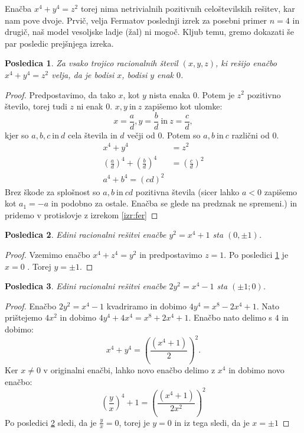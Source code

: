 \documentclass[a4paper, 10pt]{article}
\newtheorem{posl}{Posledica}[izr]
\begin{document}
Enačba $x^4 + y^4 = z^2$ torej nima netrivialnih pozitivnih celoštevilskih rešitev, kar nam pove dvoje. Prvič, velja Fermatov poslednji izrek za posebni primer $n = 4$ in drugič, naš model vesoljske ladje (žal) ni mogoč. Kljub temu, gremo dokazati še par posledic prejšnjega izreka.

\begin{posl}
\label{pos:ena}
Za vsako trojico racionalnih števil $(x, y, z)$, ki rešijo enačbo $x^4 + y^4 = z^2$ velja, da je bodisi $x$, bodisi $y$ enak $0$.
\end{posl}

\begin{proof}
Predpostavimo, da tako $x$, kot $y$ nista enaka $0$. Potem je $z^2$ pozitivno število, torej tudi $z$ ni enak $0$. $x, y~\text{in}~z$ zapišemo kot ulomke:
\[
x = \frac{a}{d}, y = \frac{b}{d}~\text{in}~z=\frac{c}{d},
\]
kjer so $a, b, c~\text{in}~d$ cela števila in $d$ večji od $0$. Potem so $a, b~\text{in}~c$ različni od $0$.
\begin{align*}
x^4 + y^4 &= z^2 \\
(\frac{a}{d})^4 + (\frac{b}{d})^4 &= (\frac{c}{d})^2 \\
a^4 + b^4 = (cd)^2
\end{align*}
Brez škode za splošnost so $a, b~\text{in}~cd$ pozitivna števila (sicer lahko $a<0$ zapišemo kot $a_1 = -a$ in podobno za ostale. Enačba se glede na predznak ne spremeni.) in pridemo v protislovje z izrekom \ref{izr:fer}
\end{proof}

\begin{posl}
\label{pos:dva}
Edini racionalni rešitvi enačbe $y^2 = x^4 + 1$ sta $(0, \pm1)$.
\end{posl}

\begin{proof}
Vzemimo enačbo $x^4 + z^4 = y^2$ in predpostavimo $z = 1$. Po posledici \ref{pos:ena} je $x = 0$ . Torej $y = \pm 1$.
\end{proof}

\begin{posl}
\label{pos:tri}
Edini racionalni rešitvi enačbe $2y^2 = x^4 - 1$ sta $(\pm1; 0)$.
\end{posl}

\begin{proof}
Enačbo $2y^2 = x^4 - 1$ kvadriramo in dobimo $4y^4 = x^8 - 2x^4 + 1$. Nato prištejemo $4x^2$ in dobimo $4y^4 + 4x^4 = x^8 +2x^4 + 1$. Enačbo nato delimo s $4$ in dobimo:
\[
x^4 + y^4 = (\frac{(x^4 + 1)}{2})^2.
\]
Ker $x\neq 0$ v originalni enačbi, lahko novo enačbo delimo z $x^4$ in dobimo novo enačbo:
\[
(\frac{y}{x})^4 + 1 = (\frac{(x^4 + 1)}{2x^2})^2
\]
Po posledici \ref{pos:dva} sledi, da je $\frac{y}{x} = 0$, torej je $y = 0$ in iz tega sledi, da je $x = \pm 1$
\end{proof}
\end{document}
